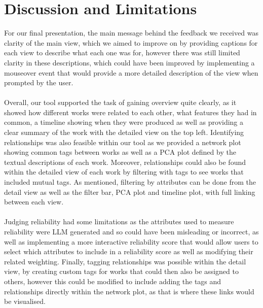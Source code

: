 \documentclass{article}
\begin{document}
\section{Discussion and Limitations}
For our final presentation, the main message behind the feedback we received was clarity of the main view, which we aimed to improve on by providing captions for each view to describe what each one was for, however there was still limited clarity in these descriptions, which could have been improved by implementing a mouseover event that would provide a more detailed description of the view when prompted by the user. 
\\\\
Overall, our tool supported the task of gaining overview quite clearly, as it showed how different works were related to each other, what features they had in common, a timeline showing when they were produced as well as providing a clear summary of the work with the detailed view on the top left. Identifying relationships was also feasible within our tool as we provided a network plot showing common tags between works as well as a PCA plot defined by the textual descriptions of each work. Moreover, relationships could also be found within the detailed view of each work by filtering with tags to see works that included mutual tags. As mentioned, filtering by attributes can be done from the detail view as well as the filter bar, PCA plot and timeline plot, with full linking between each view.
\\\\
Judging reliability had some limitations as the attributes used to measure reliability were LLM generated and so could have been misleading or incorrect, as well as implementing a more interactive reliability score that would allow users to select which attributes to include in a reliability score as well as modifying their related weighting. Finally, tagging relationships was possible within the detail view, by creating custom tags for works that could then also be assigned to others, however this could be modified to include adding the tags and relationships directly within the network plot, as that is where these links would be visualised.
\end{document}
